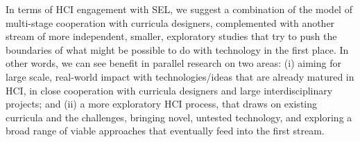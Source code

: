 \documentclass[prodmode,acmtochi]{acmsmall}
\newcommand{\GeraldineTODO}[1]{}
\begin{document}
In terms of HCI engagement with SEL, we suggest a combination of the  model of multi-stage cooperation with curricula designers, complemented %
with another stream of more independent, smaller, exploratory studies that try to push the boundaries of what might be possible to do with technology in the first place.  In other words, we can see benefit in parallel research on two areas: (i) aiming for large scale, real-world impact with technologies/ideas that are already matured in HCI, in close cooperation with curricula designers and large interdisciplinary projects; and (ii) a more exploratory HCI process, that draws on existing curricula and the challenges, bringing novel, untested technology, and exploring a broad range of viable approaches that eventually feed into the first stream. 

\GeraldineTODO{PETR --- agree this is an another possibility, but seems to clash a bit with the argument that SEL can teach us how to evaluate technologies in this space. I didn't know how to best go about this, so left it for now, and hope to return to it once all other points are done.
GF NOTE: also an opportunity around evaluation, to complement more quantitative outcome based evaluations (to show effectiveness/evidence base) with more qualitative 'process' evaluations (eg picking on push by some in medical reserach to use a realist evaluation approach) to unpack the contexts, conditions, behaviours that are implicated in acheiving particular outcomes in particular situations for particular people etc.}





\end{document}
